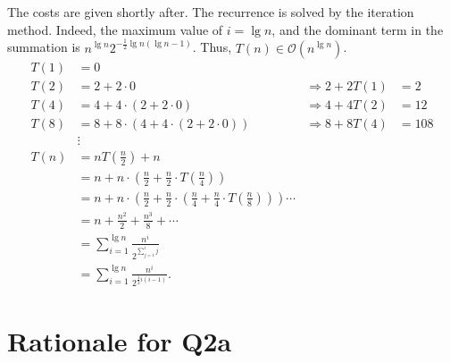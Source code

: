 \documentclass[12pt]{article}
\begin{document}
\begin{enumerate}
\begin{enumerate}
        The costs are given shortly after. The recurrence is solved by the iteration method. Indeed, the maximum value of $i = \lg n$, and the dominant term in the summation is $n^{\lg n} 2^{-\frac{1}{2}\lg n(\lg n - 1)}$. Thus, $T(n) \in \mathcal{O}(n^{\lg n})$.
        \begin{align*}
            T(1) &= 0 \\
            T(2) &= 2 + 2 \cdot 0 &\Rightarrow 2 + 2T(1) &= 2 \\
            T(4) &= 4 + 4 \cdot (2 + 2 \cdot 0) &\Rightarrow 4 + 4T(2) &= 12 \\
            T(8) &= 8 + 8 \cdot (4 + 4 \cdot (2 + 2 \cdot 0)) &\Rightarrow 8 + 8T(4) &= 108 \\
            &\vdots \\
            T(n) &= nT(\tfrac{n}{2}) + n \\
            &= n + n \cdot (\tfrac{n}{2} + \tfrac{n}{2} \cdot T(\tfrac{n}{4})) \\
            &= n + n \cdot (\tfrac{n}{2} + \tfrac{n}{2} \cdot (\tfrac{n}{4} + \tfrac{n}{4} \cdot T(\tfrac{n}{8}))) \cdots \\
            &= n + \tfrac{n^{2}}{2} + \tfrac{n^{3}}{8} + \cdots \\
            &= \sum_{i = 1}^{\lg n} \frac{n^{i}}{2^{\sum_{j = 1}^{i} j}} \\
            &= \sum_{i = 1}^{\lg n} \frac{n^{i}}{2^{\frac{1}{2}i (i - 1)}}.
        \end{align*}
    \end{enumerate}
\end{enumerate}

\appendix

\section{Rationale for Q2a}
\end{document}
